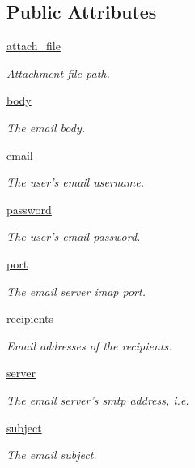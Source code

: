 \subsection*{Public Attributes}
\begin{DoxyCompactItemize}
\item 
\hyperlink{classRappCloud_1_1CloudMsgs_1_1EmailSend_1_1EmailSend_1_1Request_a6efac2c1a3e5576310bb7fc4f28b3dff}{attach\-\_\-file}
\begin{DoxyCompactList}\small\item\em Attachment file path. \end{DoxyCompactList}\item 
\hyperlink{classRappCloud_1_1CloudMsgs_1_1EmailSend_1_1EmailSend_1_1Request_a9abafdaac60f40b3183e8938dca5108a}{body}
\begin{DoxyCompactList}\small\item\em The email body. \end{DoxyCompactList}\item 
\hyperlink{classRappCloud_1_1CloudMsgs_1_1EmailSend_1_1EmailSend_1_1Request_acd47a0fab97f1bf655d847cf5bc037f4}{email}
\begin{DoxyCompactList}\small\item\em The user's email username. \end{DoxyCompactList}\item 
\hyperlink{classRappCloud_1_1CloudMsgs_1_1EmailSend_1_1EmailSend_1_1Request_afafc9e4063bae627f3ef8734b5d43616}{password}
\begin{DoxyCompactList}\small\item\em The user's email password. \end{DoxyCompactList}\item 
\hyperlink{classRappCloud_1_1CloudMsgs_1_1EmailSend_1_1EmailSend_1_1Request_ac4521e1068c1e634c76ee75be1c015d0}{port}
\begin{DoxyCompactList}\small\item\em The email server imap port. \end{DoxyCompactList}\item 
\hyperlink{classRappCloud_1_1CloudMsgs_1_1EmailSend_1_1EmailSend_1_1Request_ab69762f74d75ce786fe0a1b6a0878f6d}{recipients}
\begin{DoxyCompactList}\small\item\em Email addresses of the recipients. \end{DoxyCompactList}\item 
\hyperlink{classRappCloud_1_1CloudMsgs_1_1EmailSend_1_1EmailSend_1_1Request_aba5bc698fee8c97a97016f5f7b089915}{server}
\begin{DoxyCompactList}\small\item\em The email server's smtp address, i.\-e. \end{DoxyCompactList}\item 
\hyperlink{classRappCloud_1_1CloudMsgs_1_1EmailSend_1_1EmailSend_1_1Request_aab66642bb7ce90b5338434726cd5ec95}{subject}
\begin{DoxyCompactList}\small\item\em The email subject. \end{DoxyCompactList}\end{DoxyCompactItemize}


